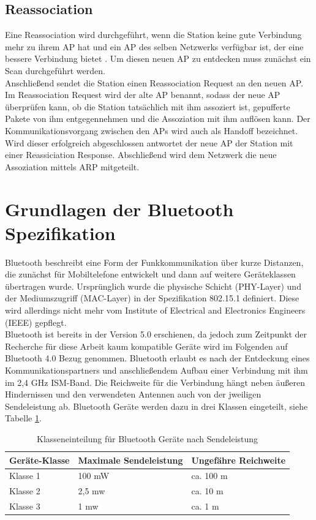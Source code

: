 \subsection{Reassociation}
Eine Reassociation wird durchgeführt, wenn die Station keine gute Verbindung mehr zu ihrem AP hat und ein AP des selben Netzwerks verfügbar ist, der eine bessere Verbindung bietet \cite{ieee2012reassociate}.
Um diesen neuen AP zu entdecken muss zunächst ein Scan durchgeführt werden. \\
Anschließend sendet die Station einen Reassociation Request an den neuen AP. 
Im Reassociation Request wird der alte AP benannt, sodass der neue AP überprüfen kann, ob die Station tatsächlich mit ihm assoziert ist, gepufferte Pakete von ihm entgegennehmen und die Assoziation mit ihm auflösen kann.
Der Kommunikationsvorgang zwischen den APs wird auch als Handoff bezeichnet. 
Wird dieser erfolgreich abgeschlossen antwortet der neue AP der Station mit einer Reassiciation Response.
Abschließend wird dem Netzwerk die neue Assoziation mittels ARP mitgeteilt.


\section{Grundlagen der Bluetooth Spezifikation}
Bluetooth beschreibt eine Form der Funkkommunikation über kurze Distanzen, die zunächst für Mobiltelefone entwickelt und dann auf weitere Geräteklassen übertragen wurde.
Ursprünglich wurde die physische Schicht (PHY-Layer) und der Mediumszugriff (MAC-Layer) in der Spezifikation 802.15.1 definiert. %
Diese wird allerdings nicht mehr vom Institute of Electrical and Electronics Engineers (IEEE) gepflegt. \\
Bluetooth ist bereits in der Version 5.0 erschienen, da jedoch zum Zeitpunkt der Recherche für diese Arbeit kaum kompatible Geräte wird im Folgenden auf Bluetooth 4.0 Bezug genommen.
Bluetooth erlaubt es nach der Entdeckung eines Kommunikationspartners und anschließendem Aufbau einer Verbindung mit ihm im 2,4 GHz ISM-Band.
Die Reichweite für die Verbindung hängt neben äußeren Hindernissen und den verwendeten Antennen auch von der jweiligen Sendeleistung ab.
Bluetooth Geräte werden dazu in drei Klassen eingeteilt, siehe Tabelle \ref{table:blclass}.

\begin{table}[h]
	\centering
	\caption{Klasseneinteilung für Bluetooth Geräte nach Sendeleistung} %
	\label{table:blclass}
	\begin{tabular}{l|l|l}
		Geräte-Klasse & Maximale Sendeleistung & Ungefähre Reichweite \\
		\hline
		Klasse 1 & 100 mW & ca. 100 m \\
		Klasse 2 & 2,5 mw & ca. 10 m  \\
		Klasse 3 & 1 mw & ca. 1 m  \\
	\end{tabular}
\end{table}

